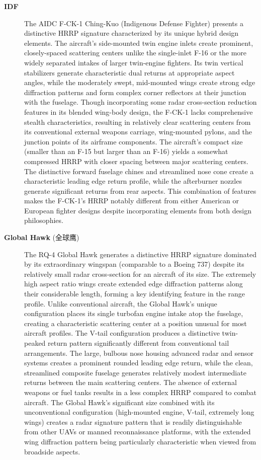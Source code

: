 {\begin{description}
    \item[\textbf{IDF}]
    The AIDC F-CK-1 Ching-Kuo (Indigenous Defense Fighter) presents a distinctive HRRP signature characterized by its unique hybrid design elements. The aircraft's side-mounted twin engine inlets create prominent, closely-spaced scattering centers unlike the single-inlet F-16 or the more widely separated intakes of larger twin-engine fighters. Its twin vertical stabilizers generate characteristic dual returns at appropriate aspect angles, while the moderately swept, mid-mounted wings create strong edge diffraction patterns and form complex corner reflectors at their junction with the fuselage. Though incorporating some radar cross-section reduction features in its blended wing-body design, the F-CK-1 lacks comprehensive stealth characteristics, resulting in relatively clear scattering centers from its conventional external weapons carriage, wing-mounted pylons, and the junction points of its airframe components. The aircraft's compact size (smaller than an F-15 but larger than an F-16) yields a somewhat compressed HRRP with closer spacing between major scattering centers. The distinctive forward fuselage chines and streamlined nose cone create a characteristic leading edge return profile, while the afterburner nozzles generate significant returns from rear aspects. This combination of features makes the F-CK-1's HRRP notably different from either American or European fighter designs despite incorporating elements from both design philosophies.

    \item[\textbf{Global Hawk} (全球鹰)]
    The RQ-4 Global Hawk generates a distinctive HRRP signature dominated by its extraordinary wingspan (comparable to a Boeing 737) despite its relatively small radar cross-section for an aircraft of its size. The extremely high aspect ratio wings create extended edge diffraction patterns along their considerable length, forming a key identifying feature in the range profile. Unlike conventional aircraft, the Global Hawk's unique configuration places its single turbofan engine intake atop the fuselage, creating a characteristic scattering center at a position unusual for most aircraft profiles. The V-tail configuration produces a distinctive twin-peaked return pattern significantly different from conventional tail arrangements. The large, bulbous nose housing advanced radar and sensor systems creates a prominent rounded leading edge return, while the clean, streamlined composite fuselage generates relatively modest intermediate returns between the main scattering centers. The absence of external weapons or fuel tanks results in a less complex HRRP compared to combat aircraft. The Global Hawk's significant size combined with its unconventional configuration (high-mounted engine, V-tail, extremely long wings) creates a radar signature pattern that is readily distinguishable from other UAVs or manned reconnaissance platforms, with the extended wing diffraction pattern being particularly characteristic when viewed from broadside aspects.


\end{description}}
